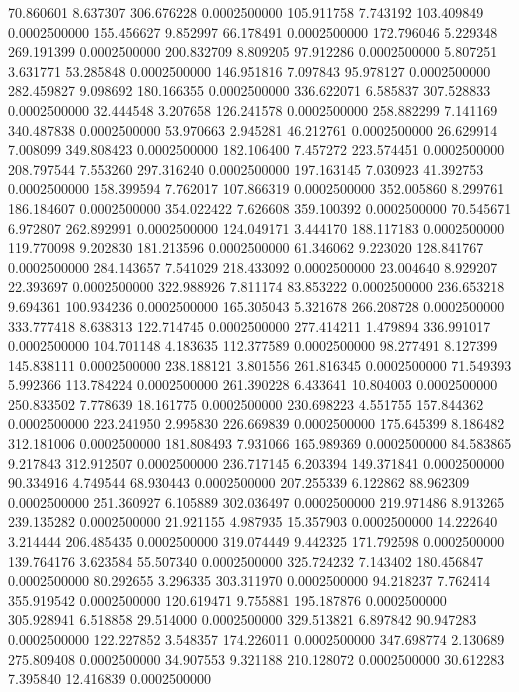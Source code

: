 70.860601 8.637307 306.676228 0.0002500000
105.911758 7.743192 103.409849 0.0002500000
155.456627 9.852997 66.178491 0.0002500000
172.796046 5.229348 269.191399 0.0002500000
200.832709 8.809205 97.912286 0.0002500000
5.807251 3.631771 53.285848 0.0002500000
146.951816 7.097843 95.978127 0.0002500000
282.459827 9.098692 180.166355 0.0002500000
336.622071 6.585837 307.528833 0.0002500000
32.444548 3.207658 126.241578 0.0002500000
258.882299 7.141169 340.487838 0.0002500000
53.970663 2.945281 46.212761 0.0002500000
26.629914 7.008099 349.808423 0.0002500000
182.106400 7.457272 223.574451 0.0002500000
208.797544 7.553260 297.316240 0.0002500000
197.163145 7.030923 41.392753 0.0002500000
158.399594 7.762017 107.866319 0.0002500000
352.005860 8.299761 186.184607 0.0002500000
354.022422 7.626608 359.100392 0.0002500000
70.545671 6.972807 262.892991 0.0002500000
124.049171 3.444170 188.117183 0.0002500000
119.770098 9.202830 181.213596 0.0002500000
61.346062 9.223020 128.841767 0.0002500000
284.143657 7.541029 218.433092 0.0002500000
23.004640 8.929207 22.393697 0.0002500000
322.988926 7.811174 83.853222 0.0002500000
236.653218 9.694361 100.934236 0.0002500000
165.305043 5.321678 266.208728 0.0002500000
333.777418 8.638313 122.714745 0.0002500000
277.414211 1.479894 336.991017 0.0002500000
104.701148 4.183635 112.377589 0.0002500000
98.277491 8.127399 145.838111 0.0002500000
238.188121 3.801556 261.816345 0.0002500000
71.549393 5.992366 113.784224 0.0002500000
261.390228 6.433641 10.804003 0.0002500000
250.833502 7.778639 18.161775 0.0002500000
230.698223 4.551755 157.844362 0.0002500000
223.241950 2.995830 226.669839 0.0002500000
175.645399 8.186482 312.181006 0.0002500000
181.808493 7.931066 165.989369 0.0002500000
84.583865 9.217843 312.912507 0.0002500000
236.717145 6.203394 149.371841 0.0002500000
90.334916 4.749544 68.930443 0.0002500000
207.255339 6.122862 88.962309 0.0002500000
251.360927 6.105889 302.036497 0.0002500000
219.971486 8.913265 239.135282 0.0002500000
21.921155 4.987935 15.357903 0.0002500000
14.222640 3.214444 206.485435 0.0002500000
319.074449 9.442325 171.792598 0.0002500000
139.764176 3.623584 55.507340 0.0002500000
325.724232 7.143402 180.456847 0.0002500000
80.292655 3.296335 303.311970 0.0002500000
94.218237 7.762414 355.919542 0.0002500000
120.619471 9.755881 195.187876 0.0002500000
305.928941 6.518858 29.514000 0.0002500000
329.513821 6.897842 90.947283 0.0002500000
122.227852 3.548357 174.226011 0.0002500000
347.698774 2.130689 275.809408 0.0002500000
34.907553 9.321188 210.128072 0.0002500000
30.612283 7.395840 12.416839 0.0002500000
